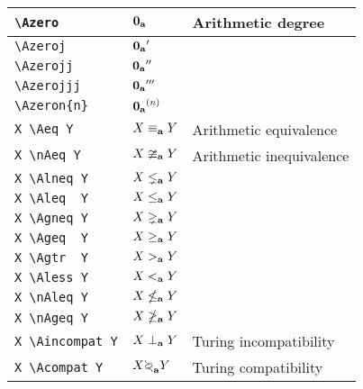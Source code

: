 \documentclass[leqno,11pt]{amsart}
\begin{document}
\begin{xtabular}{l |  l | l}
  \verb=\Azero=                                          & \( 	{\mathbf{0}_{\mathbf{a}}}                                	   \)   & Arithmetic degree \\ \midrule
  \verb=\Azeroj=                                          & \( 	\Azeroj                                	   \)   & \\ \midrule
	\verb=\Azerojj=                                         & \( 	{\mathbf{0}_{\mathbf{a}}}''                               	   \)   & \\ \midrule
	\verb=\Azerojjj=                                         & \( 	{\mathbf{0}_{\mathbf{a}}}'''                               	   \)   & \\ \midrule
	\verb=\Azeron{n}=                                       & \( 	{\mathbf{0}_{\mathbf{a}}}^{(n)}                             	   \)   & \\ \midrule
  \verb=X \Aeq Y=                                     	 & \( 	X \mathrel{\equiv_{\mathbf{a}}} Y                           	   \)				& Arithmetic equivalence \\ \midrule
	\verb=X \nAeq Y=                                    	 & \( 	X \mathrel{\ncong_{\mathbf{a}}} Y                          	   \)   		& Arithmetic inequivalence \\ \midrule
  \verb=X \Alneq Y=                               			& \(  X \lneq_{\mathbf{a}} Y   \)   & \\ \midrule
  \verb=X \Aleq  Y=                               			& \(  X \leq_{\mathbf{a}}  Y   \)   & \\ \midrule
  \verb=X \Agneq Y=                               			& \(  X \gneq_{\mathbf{a}} Y   \)   & \\ \midrule
  \verb=X \Ageq  Y=                               			& \(  X \geq_{\mathbf{a}}  Y   \)   & \\ \midrule
  \verb=X \Agtr  Y=                               			& \(  X >_{\mathbf{a}}  Y   \)   & \\ \midrule
  \verb=X \Aless Y=                               			& \(  X <_{\mathbf{a}} Y   \)   & \\ \midrule
  \verb=X \nAleq Y=                               			& \(  X \nleq_{\mathbf{a}} Y   \)   & \\ \midrule
  \verb=X \nAgeq Y=                               			& \(  X \ngeq_{\mathbf{a}} Y   \)   & \\ \midrule
  \verb=X \Aincompat Y=                                   & \(  X \Aincompat Y   \) & Turing incompatibility \\ \midrule 
  \verb=X \Acompat Y=                               		&  \(  X \Acompat Y \)  &  Turing compatibility  \\ \midrule

		\bottomrule
	\end{xtabular}          \\
\makeatletter
\end{document}
